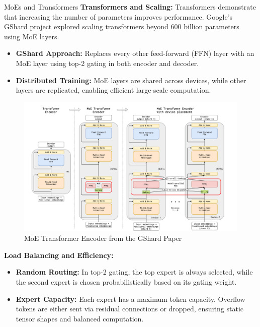 \begin{frame}[allowframebreaks]{MoEs and Transformers}
    \textbf{Transformers and Scaling:} Transformers demonstrate that increasing the number of parameters improves performance. Google’s GShard project explored scaling transformers beyond 600 billion parameters using MoE layers.

    \begin{itemize}
        \item \textbf{GShard Approach:} Replaces every other feed-forward (FFN) layer with an MoE layer using top-2 gating in both encoder and decoder.
        \item \textbf{Distributed Training:} MoE layers are shared across devices, while other layers are replicated, enabling efficient large-scale computation.
    \end{itemize}

    \begin{figure}
        \centering
        \includegraphics[height=0.8\textheight,width=1\textwidth,keepaspectratio]{images/recent-advance/gshard-moe-encoder.png}
        \caption*{MoE Transformer Encoder from the GShard Paper}
    \end{figure}

\framebreak

    \textbf{Load Balancing and Efficiency:}
    \begin{itemize}
        \item \textbf{Random Routing:} In top-2 gating, the top expert is always selected, while the second expert is chosen probabilistically based on its gating weight.
        \item \textbf{Expert Capacity:} Each expert has a maximum token capacity. Overflow tokens are either sent via residual connections or dropped, ensuring static tensor shapes and balanced computation.
    \end{itemize}


\end{frame}

